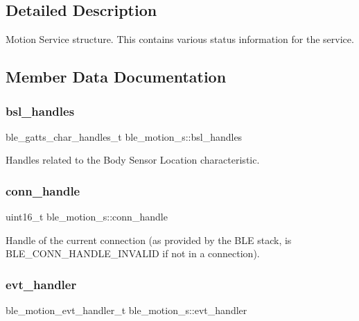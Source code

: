 \subsection{Detailed Description}
Motion Service structure. This contains various status information for the service. 

\subsection{Member Data Documentation}
\mbox{\label{structble__motion__s_afd1d7f5aa5d5250cf69dab40b47d12a8}} 
\subsubsection{\texorpdfstring{bsl\_handles}{bsl\_handles}}
{\footnotesize\ttfamily ble\+\_\+gatts\+\_\+char\+\_\+handles\+\_\+t ble\+\_\+motion\+\_\+s\+::bsl\+\_\+handles}

Handles related to the Body Sensor Location characteristic. \mbox{\label{structble__motion__s_a50e8d63fbf3255cf706517bd837b8d60}} 
\subsubsection{\texorpdfstring{conn\_handle}{conn\_handle}}
{\footnotesize\ttfamily uint16\+\_\+t ble\+\_\+motion\+\_\+s\+::conn\+\_\+handle}

Handle of the current connection (as provided by the B\+LE stack, is B\+L\+E\+\_\+\+C\+O\+N\+N\+\_\+\+H\+A\+N\+D\+L\+E\+\_\+\+I\+N\+V\+A\+L\+ID if not in a connection). \mbox{\label{structble__motion__s_aa576a74bdbf00c090ef2cf0be2cb3f99}} 
\subsubsection{\texorpdfstring{evt\_handler}{evt\_handler}}
{\footnotesize\ttfamily ble\+\_\+motion\+\_\+evt\+\_\+handler\+\_\+t ble\+\_\+motion\+\_\+s\+::evt\+\_\+handler}

